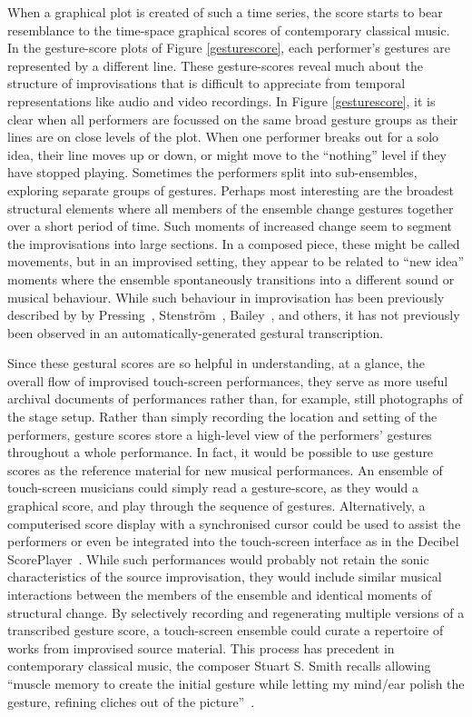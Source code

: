 \documentclass[graybox]{svmult}
\begin{document}
When a graphical plot is created of such a time series, the score
starts to bear resemblance to the time-space graphical scores of
contemporary classical music. In the gesture-score plots of Figure
\ref{gesturescore}, each performer's gestures are represented by a
different line. These gesture-scores reveal much about the
structure of improvisations that is difficult to appreciate from
temporal representations like audio and video recordings. In Figure
\ref{gesturescore}, it is clear when all performers are focussed on
the same broad gesture groups as their lines are on close levels of
the plot. When one performer breaks out for a solo idea, their line
moves up or down, or might move to the ``nothing'' level if they 
have stopped playing. Sometimes the performers split into
sub-ensembles, exploring separate groups of gestures. Perhaps most
interesting are the broadest structural elements where all members of
the ensemble change gestures together over a short period of time.
Such moments of increased change seem to segment the improvisations
into large sections. In a composed piece, these might be called
movements, but in an improvised setting, they appear to be related to
``new idea'' moments where the ensemble spontaneously transitions into
a different sound or musical behaviour. While such behaviour in
improvisation has been previously described by by
Pressing~\cite{Pressing:1988uo}, Stenstr\"om~\cite{Stenstrom:2009xy},
Bailey~\cite{Bailey:1993zl}, and others, it has not previously been
observed in an automatically-generated gestural transcription.

Since these gestural scores are so helpful in understanding, at a
glance, the overall flow of improvised touch-screen performances, they
serve as more useful archival documents of performances rather than, for
example, still photographs of the stage setup. Rather than simply
recording the location and setting of the performers, gesture scores
store a high-level view of the performers' gestures throughout a whole
performance. In fact, it would be possible to use gesture scores as
the reference material for new musical performances. An ensemble of
touch-screen musicians could simply read a gesture-score, as they
would a graphical score, and play through the sequence of gestures.
Alternatively, a computerised score display with a synchronised cursor
could be used to assist the performers or even be integrated into the
touch-screen interface as in the Decibel
ScorePlayer~\cite{Hope:2015lr}. While such performances would probably
not retain the sonic characteristics of the source improvisation, they
would include similar musical interactions between the members of the
ensemble and identical moments of structural change. By selectively
recording and regenerating multiple versions of a transcribed gesture
score, a touch-screen ensemble could curate a repertoire of works from
improvised source material. This process has precedent in contemporary
classical music, the composer Stuart S. Smith recalls allowing
``muscle memory to create the initial gesture while letting my
mind/ear polish the gesture, refining cliches out of the
picture''~\cite{Smith:1998ff}.
\end{document}
